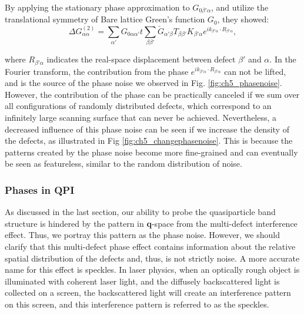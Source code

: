 \noindent By applying the stationary phase approximation \cite{lounisTheoryRealSpace2011} to $G_{0\beta'\alpha}$, and utilize the translational symmetry of Bare lattice Green's function $G_0$, they showed:
\begin{equation}
	\label{eq.539}
	\Delta G^{(2)}_{\alpha\alpha}=\sum_{\alpha'}G_{0\alpha\alpha'}t\sum_{\beta\beta'}\check{G}_{\alpha'\beta}T_{\beta\beta'}K_{\beta'\alpha}e^{ik_{\beta'\alpha}\cdot R_{\beta'\alpha}},
\end{equation}

\noindent where $R_{\beta'\alpha}$ indicates the real-space displacement between defect $\beta'$ and $\alpha$. In the Fourier transform, the contribution from the phase $e^{ik_{\beta'\alpha}\cdot R_{\beta'\alpha}}$ can not be lifted, and is the source of the phase noise we observed in Fig. \ref{fig:ch5_phasenoise}. However, the contribution of the phase can be practically canceled if we sum over all configurations of randomly distributed defects, which correspond to an infinitely large scanning surface that can never be achieved. Nevertheless, a decreased influence of this phase noise can be seen if we increase the density of the defects, as illustrated in Fig \ref{fig:ch5_changephasenoise}. This is because the patterns created by the phase noise become more fine-grained and can eventually be seen as featureless, similar to the random distribution of noise.  



\subsubsection{Phases in QPI}
As discussed in the last section, our ability to probe the quasiparticle band structure is hindered by the pattern in \textbf{q}-space from the multi-defect interference effect. Thus, we portray this pattern as the phase noise. However, we should clarify that this multi-defect phase effect contains information about the relative spatial distribution of the defects and, thus, is not strictly noise. A more accurate name for this effect is speckles. In laser physics, when an optically rough object is illuminated with coherent laser light, and the diffusely backscattered light is collected on a screen, the backscattered light will create an interference pattern on this screen, and this interference pattern is referred to as the speckles\cite{ReviewLaserSpeckle}.

